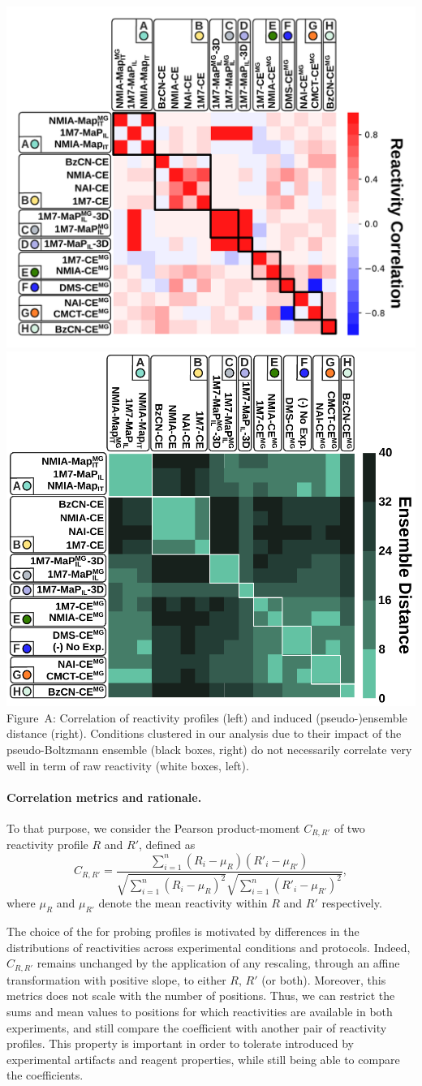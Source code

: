 \documentclass[9pt,hyperref]{article} %
\begin{document}
\begin{enumerate}
{{						\includegraphics[width=.54\textwidth]{graphs/didy/reactivity_correlation.pdf}\hfill
			\includegraphics[width=.45\textwidth]{graphs/didy/bi_clustering.pdf}\\
			\noindent Figure~A: Correlation of reactivity profiles (left) and induced (pseudo-)ensemble distance (right). Conditions clustered in our analysis due to their impact of the pseudo-Boltzmann ensemble (black boxes, right) do not necessarily correlate very well in term of raw reactivity (white boxes, left).
			
			
			\paragraph{Correlation metrics and rationale.}To that purpose, we consider the Pearson product-moment  $C_{R,R'}$ of two reactivity profile $R$ and $R'$, defined as
			$$ C_{R,R'} = \frac{\sum^n_{i=1}\left(R_i - \mu_R\right)\left(R'_i - \mu_{R'}\right)}{\sqrt{\sum ^n _{i=1}\left(R_i - \mu_{R}\right)^2} \sqrt{\sum ^n _{i=1}\left(R'_i - \mu_{R'}\right)^2}},$$ 
			where $\mu_{R}$ and $\mu_{R'}$  denote the mean reactivity within $R$ and $R'$ respectively. 
			
			The choice of the  for probing profiles is motivated by differences in the distributions of reactivities across experimental conditions and protocols. 
			Indeed, $C_{R,R'}$ remains unchanged by the application of any rescaling, through an affine transformation with positive slope, to either $R$, $R'$ (or both). Moreover, this metrics does not scale with the number of positions.
			Thus, we can restrict the sums and mean values to positions for which reactivities are available in both experiments, and still compare the coefficient with another pair of reactivity profiles. This property is important in order to tolerate  introduced by experimental artifacts and reagent properties, while still being able to compare the coefficients.			
			
}}
\end{enumerate}
\end{document}
